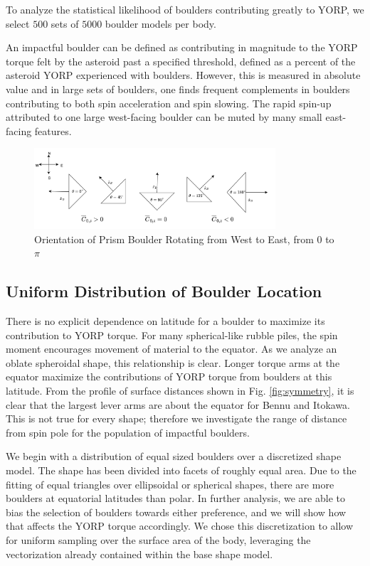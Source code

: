 To analyze the statistical likelihood of boulders contributing greatly to YORP, we select $500$ sets of $5000$ boulder models per body. 


An impactful boulder can be defined as contributing in magnitude to the YORP torque felt by the asteroid past a specified threshold, defined as a percent of the asteroid YORP experienced with boulders. However, this is measured in absolute value and in large sets of boulders, one finds frequent complements in boulders contributing to both spin acceleration and spin slowing. The rapid spin-up attributed to one large west-facing boulder can be muted by many small east-facing features. 
\begin{figure}[t!]
    \centering
    \includegraphics[width=0.8\textwidth]{fig/rotating_wedge.png}
    \caption{Orientation of Prism Boulder Rotating from West to East, from $0$ to $\pi$}
    \label{fig:rotate}
\end{figure}

\subsection{Uniform Distribution of Boulder Location}\label{location}
There is no explicit dependence on latitude for a boulder to maximize its contribution to YORP torque. For many spherical-like rubble piles, the spin moment encourages movement of material to the equator. As we analyze an oblate spheroidal shape, this relationship is clear. Longer torque arms at the equator maximize the contributions of YORP torque from boulders at this latitude. From the profile of surface distances shown in Fig. \ref{fig:symmetry}, it is clear that the largest lever arms are about the equator for Bennu and Itokawa. This is not true for every shape; therefore we investigate the range of distance from spin pole for the population of impactful boulders.

We begin with a distribution of equal sized boulders over a discretized shape model. The shape has been divided into facets of roughly equal area. Due to the fitting of equal triangles over ellipsoidal or spherical shapes, there are more boulders at equatorial latitudes than polar. In further analysis, we are able to bias the selection of boulders towards either preference, and we will show how that affects the YORP torque accordingly. We chose this discretization to allow for uniform sampling over the surface area of the body, leveraging the vectorization already contained within the base shape model.



